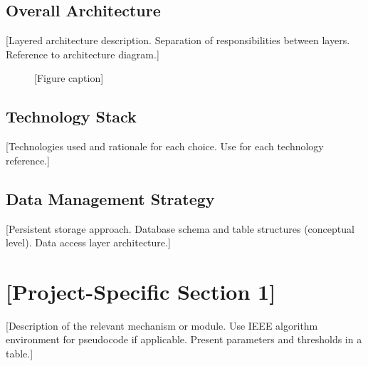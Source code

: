 \documentclass[conference]{IEEEtran}
\begin{document}
\subsection{Overall Architecture}

[Layered architecture description.
Separation of responsibilities between layers.
Reference to architecture diagram.]

\begin{figure}[H]
  \centering
  \caption{[Figure caption]}
  \label{fig:architecture}
\end{figure}

\subsection{Technology Stack}

[Technologies used and rationale for each choice.
Use \cite{} for each technology reference.]

\subsection{Data Management Strategy}

[Persistent storage approach.
Database schema and table structures (conceptual level).
Data access layer architecture.]


\section{[Project-Specific Section 1]}

[Description of the relevant mechanism or module.
Use IEEE algorithm environment for pseudocode if applicable.
Present parameters and thresholds in a table.]

\begin{algorithm}[H]
\caption{[Algorithm Name]}
\begin{algorithmic}[1]
\STATE [Step 1]
\STATE [Step 2]
\IF{[condition]}
  \STATE [action]
\ENDIF
\RETURN [result]
\end{algorithmic}
\end{algorithm}
\end{document}
